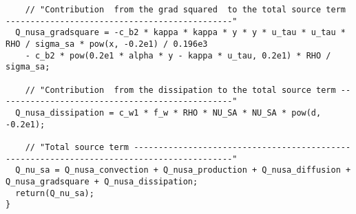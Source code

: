 \documentclass[10pt]{article}
\begin{document}
\begin{footnotesize}
\begin{verbatim}
    // "Contribution  from the grad squared  to the total source term ----------------------------------------------"
  Q_nusa_gradsquare = -c_b2 * kappa * kappa * y * y * u_tau * u_tau * RHO / sigma_sa * pow(x, -0.2e1) / 0.196e3 
    - c_b2 * pow(0.2e1 * alpha * y - kappa * u_tau, 0.2e1) * RHO / sigma_sa;

    // "Contribution  from the dissipation to the total source term ------------------------------------------------"
  Q_nusa_dissipation = c_w1 * f_w * RHO * NU_SA * NU_SA * pow(d, -0.2e1);

    // "Total source term ------------------------------------------------------------------------------------------"
  Q_nu_sa = Q_nusa_convection + Q_nusa_production + Q_nusa_diffusion + Q_nusa_gradsquare + Q_nusa_dissipation;
  return(Q_nu_sa);
}
\end{verbatim}
\end{footnotesize}


 


\appendix

%
\end{document}
